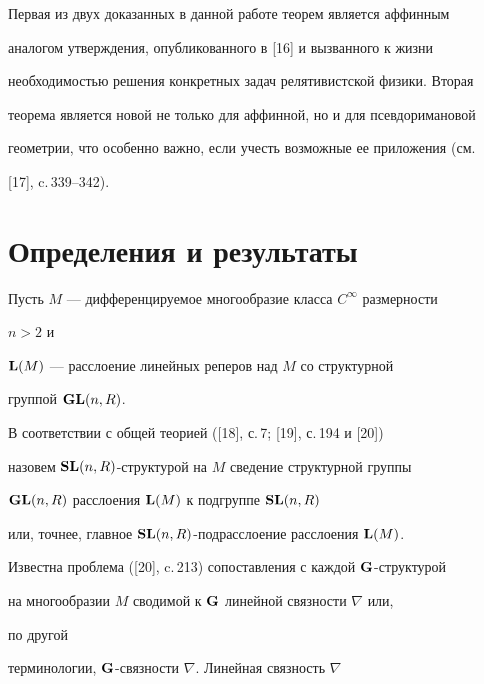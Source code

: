  


Первая из двух доказанных в данной работе теорем является аффинным 


аналогом утверждения, опубликованного в [16] и вызванного к жизни 


необходимостью решения конкретных задач релятивистской физики. Вторая 


теорема является новой не только для аффинной, но и для псевдоримановой 


геометрии, что особенно важно, если учесть возможные ее приложения (см. 


[17], c.\,339--342). 


 


 


\section{Определения и результаты} 


 


 


Пусть $M$ --- дифференцируемое многообразие класса $C^\infty$ размерности 


$n>2$ и 


$\bold L(M)$ --- расслоение линейных реперов над $M$ со структурной 


группой $\bold {GL}(n,R)$. 


 


В соответствии с общей теорией ([18], с.\,7; [19], с.\,194 и [20]) 


назовем $\bold {SL}(n,R)$-структурой на $M$ сведение структурной группы 


$\bold {GL}(n,R)$ расслоения $\bold L(M)$ к подгруппе $\bold {SL}(n,R)$ 


или, точнее, главное $\bold {SL}(n,R)$-подрасслоение расслоения $\bold 


L(M)$. 


 


Известна проблема ([20], c.\,213) сопоставления с каждой $\bold 


G$-структурой 


на многообразии $M$ сводимой к $\bold G$ линейной связности $\nabla$ или, 


по другой 


терминологии, $\bold G$-связности $\nabla$. Линейная связность $\nabla$ 



